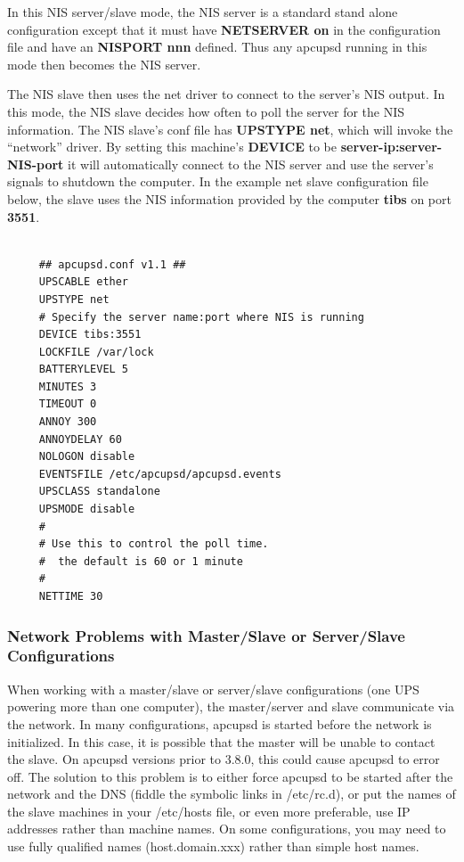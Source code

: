 {{{{{{{{{In this NIS server/slave mode, the NIS server is a standard stand alone
configuration except that it must have {\bf NETSERVER on} in the configuration
file and have an {\bf NISPORT nnn} defined. Thus any apcupsd running in this
mode then becomes the NIS server.  

The NIS slave then uses the net driver to connect to the server's NIS output.
In this mode, the NIS slave decides how often to poll the server for the NIS
information. The NIS slave's conf file has {\bf UPSTYPE net}, which will
invoke the ``network'' driver. By setting this machine's {\bf DEVICE} to be
{\bf server-ip:server-NIS-port} it will automatically connect to the NIS
server and use the server's signals to shutdown the computer.  In the example
net slave configuration file below, the slave uses the NIS information
provided by the computer {\bf tibs} on port {\bf 3551}. 

\footnotesize
\begin{verbatim}
     
     ## apcupsd.conf v1.1 ##
     UPSCABLE ether
     UPSTYPE net
     # Specify the server name:port where NIS is running
     DEVICE tibs:3551
     LOCKFILE /var/lock
     BATTERYLEVEL 5
     MINUTES 3
     TIMEOUT 0
     ANNOY 300
     ANNOYDELAY 60
     NOLOGON disable
     EVENTSFILE /etc/apcupsd/apcupsd.events
     UPSCLASS standalone
     UPSMODE disable
     #
     # Use this to control the poll time.
     #  the default is 60 or 1 minute
     #
     NETTIME 30
\end{verbatim}
\normalsize

\label{Network-Problems-with-Master_002fSlave-or-Server_002fSlave-Configuratio%
ns}

\subsubsection*{Network Problems with Master/Slave or Server/Slave
Configurations}

\label{index-Problems_002c-Master_002fSlave-159}
\label{index-Problems_002c-networking-160}
When working with a master/slave or server/slave configurations (one UPS
powering more than one computer), the master/server and slave communicate via
the network. In many configurations, apcupsd is started before the network is
initialized. In this case, it is possible that the master will be unable to
contact the slave. On apcupsd versions prior to 3.8.0, this could cause
apcupsd to error off. The solution to this problem is to either force apcupsd
to be started after the network and the DNS (fiddle the symbolic links in
/etc/rc.d), or put the names of the slave machines in your /etc/hosts file, or
even more preferable, use IP addresses rather than machine names. On some
configurations, you may need to use fully qualified names (host.domain.xxx)
rather than simple host names. 

}}}}}}}}}
